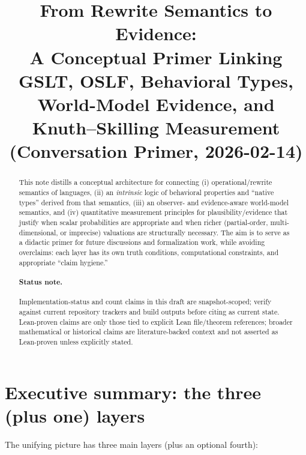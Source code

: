 \documentclass[11pt]{article}
\title{From Rewrite Semantics to Evidence:\\
A Conceptual Primer Linking GSLT, OSLF, Behavioral Types,\\
World-Model Evidence, and Knuth--Skilling Measurement\\
\large (Conversation Primer, 2026-02-14)}
\author{}
\date{}
\theoremstyle{definition}
\begin{document}
\maketitle

\vspace{-1.0em}

\begin{abstract}
This note distills a conceptual architecture for connecting (i) operational/rewrite semantics of languages,
(ii) an \emph{intrinsic} logic of behavioral properties and ``native types'' derived from that semantics,
(iii) an observer- and evidence-aware world-model semantics, and (iv) quantitative measurement
principles for plausibility/evidence that justify when scalar probabilities are appropriate and when richer
(partial-order, multi-dimensional, or imprecise) valuations are structurally necessary.
The aim is to serve as a didactic primer for future discussions and formalization work,
while avoiding overclaims: each layer has its own truth conditions, computational constraints,
and appropriate ``claim hygiene.''
\paragraph{Status note.} Implementation-status and count claims in this draft are snapshot-scoped; verify against current repository trackers and build outputs before citing as current state. Lean-proven claims are only those tied to explicit Lean file/theorem references; broader mathematical or historical claims are literature-backed context and not asserted as Lean-proven unless explicitly stated.
\end{abstract}

\tableofcontents

\section{Executive summary: the three (plus one) layers}

The unifying picture has three main layers (plus an optional fourth):
\end{document}
